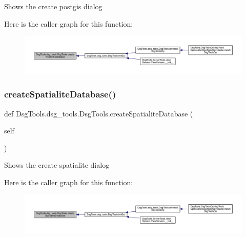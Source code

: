 \begin{DoxyVerb}Shows the create postgis dialog
\end{DoxyVerb}
 Here is the caller graph for this function\+:
\nopagebreak
\begin{figure}[H]
\begin{center}
\leavevmode
\includegraphics[width=350pt]{class_dsg_tools_1_1dsg__tools_1_1_dsg_tools_a61a45262ec8f5921d73c830dce9c41f7_icgraph}
\end{center}
\end{figure}
\mbox{\label{class_dsg_tools_1_1dsg__tools_1_1_dsg_tools_a5beaf05173d7a7150624c677df0d2af3}} 
\subsubsection{\texorpdfstring{create\+Spatialite\+Database()}{createSpatialiteDatabase()}}
{\footnotesize\ttfamily def Dsg\+Tools.\+dsg\+\_\+tools.\+Dsg\+Tools.\+create\+Spatialite\+Database (\begin{DoxyParamCaption}\item[{}]{self }\end{DoxyParamCaption})}

\begin{DoxyVerb}Shows the create spatialite dialog
\end{DoxyVerb}
 Here is the caller graph for this function\+:
\nopagebreak
\begin{figure}[H]
\begin{center}
\leavevmode
\includegraphics[width=350pt]{class_dsg_tools_1_1dsg__tools_1_1_dsg_tools_a5beaf05173d7a7150624c677df0d2af3_icgraph}
\end{center}
\end{figure}
\mbox{\label{class_dsg_tools_1_1dsg__tools_1_1_dsg_tools_a7f1c3ecc3fab9165222ccad53bc61c01}} 
